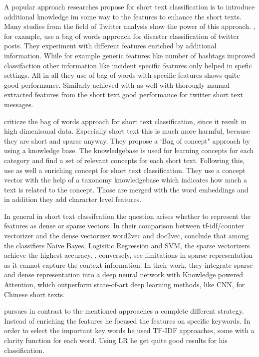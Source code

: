 \documentclass[12pt, a4paper, titlepage]{article}
\begin{document}
A popular approach researches propose for short text classification is to introduce additional knowledge im some way to the features to enhance the short texts. Many studies from the field of Twitter analysis show the power of this approach. \citet{karimi2013}, for example, use a bag of words approach for disaster classification of twitter posts. They experiment with different features enriched by additional information. While for example generic features like number of hashtags improved classifaction other information like incident specific features only helped in spefic settings. All in all they use of bag of words with specific features shows quite good performance. Similarly \citet{sriram2010} achieved with as well with thorougly manual extracted features from the short text good performance for twitter short text messages. 

\citep{WangF2014} criticze the bag of words approach for short text classification, since it result in high dimenisonal data. Especially short text this is much more harmful, because they are short and sparse anyway. They propose a `Bag of concept" approach by using a knowledge base. The knowledgebase is used for learning concepts for each category and find a set of relevant concepts for each short text. Following this, \citep{wang2017J} use as well a enriching concept for short text classification. They use a concept vector with the help of a taxonomy knowledgebase which indicates how much a text is related to the concept. Those are merged with the word embeddings and in addition they add character level features.

In general in short text classifcation the question arises whether to represent the features as dense or sparse vectors. In their comparison between tf-idf/counter vectorizer and the dense vectorizer word2vec and doc2vec, \cite{WangY2017} conclude that among the classifiers Naive Bayes, Logisitic Regression and SVM, the sparse vectorizers achieve the highest accuracy. \cite{Chen2019}, conversely, see limitations in sparse representation as it cannot capture the context information. In their work, they integrate sparse and dense representation into a deep neural network with Knowledge powered Attention, which outperform state-of-art deep learning methods, like CNN, for Chinese short texts. 

\citet{sun2012} pursues in contrast to the mentioned approaches a complete different strategy. Instead of enriching the features he focused the features on specific keywords. In order to select the important key words he used \ac{TF-IDF} approaches, some with a clarity function for each word. Using \ac{LR} he get quite good results for his classification.
\end{document}
